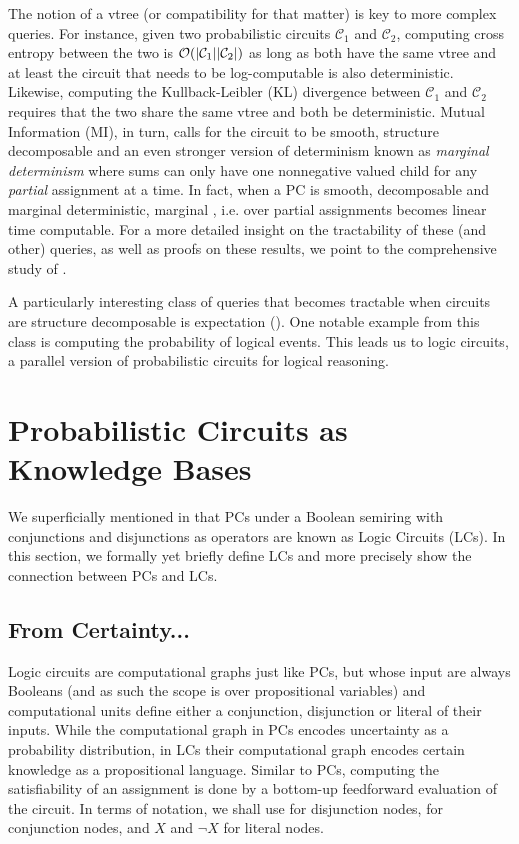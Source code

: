 The notion of a vtree (or compatibility for that matter) is key to more complex queries. For
instance, given two probabilistic circuits $\mathcal{C}_1$ and $\mathcal{C}_2$, computing cross
entropy between the two is $\mathcal{O}(|\mathcal{C}_1||\mathcal{C}_2|)$ as long as both have the same
vtree and at least the circuit that needs to be log-computable is also deterministic. Likewise,
computing the Kullback-Leibler (KL) divergence between $\mathcal{C}_1$ and $\mathcal{C}_2$ requires
that the two share the same vtree and both be deterministic. Mutual Information (MI), in turn,
calls for the circuit to be smooth, structure decomposable and an even stronger version of
determinism known as \emph{marginal determinism} where sums can only have one nonnegative valued
child for any \emph{partial} assignment at a time. In fact, when a PC is smooth, decomposable and
marginal deterministic, marginal \map{}, i.e. \map{} over partial assignments becomes linear time
computable. For a more detailed insight on the tractability of these (and other) queries, as well
as proofs on these results, we point to the comprehensive study of \citet{vergari21}.

A particularly interesting class of queries that becomes tractable when circuits are structure
decomposable is expectation (\expc{}). One notable example from this class is computing the
probability of logical events. This leads us to logic circuits, a parallel version of probabilistic
circuits for logical reasoning.

\section{Probabilistic Circuits as Knowledge Bases}

We superficially mentioned in  that PCs under a Boolean semiring with
conjunctions and disjunctions as operators are known as Logic Circuits (LCs). In this section, we
formally yet briefly define LCs and more precisely show the connection between PCs and LCs.

\subsection{From Certainty...}

Logic circuits are computational graphs just like PCs, but whose input are always Booleans (and as
such the scope is over propositional variables) and computational units define either a
conjunction, disjunction or literal of their inputs. While the computational graph in PCs encodes
uncertainty as a probability distribution, in LCs their computational graph encodes certain
knowledge as a propositional language. Similar to PCs, computing the satisfiability of an
assignment is done by a bottom-up feedforward evaluation of the circuit. In terms of notation, we
shall use \inode{\newOrNode} for disjunction nodes, \inode{\newAndNode} for conjunction nodes, and
$X$ and $\neg X$ for literal nodes.

